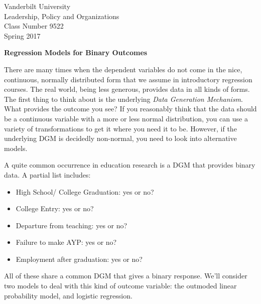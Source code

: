 \documentclass[12pt]{article}
\begin{document}
\thispagestyle{empty}%

\setlength{\parskip}{1ex plus 0.5ex minus 0.2ex}

\setcounter{secnumdepth}{-2}


\begin{flushleft}
Vanderbilt University\\Leadership, Policy and Organizations\\Class Number 9522\\ Spring 2017\\
\end{flushleft}

\begin{center}
\textbf{Regression Models for Binary Outcomes}
\end{center}


There are many times when the dependent variables  do not come in the
nice, continuous, normally distributed form that we assume in
introductory regression courses. The real world, being less generous,
provides data in all kinds of forms. The first thing to think about is
the underlying \textit{Data Generation Mechanism}. What provides the
outcome you see? If you reasonably think that the data should be a
continuous variable with a more or less normal distribution, you can
use a variety of transformations to get it where you need it to
be. However, if the underlying DGM is decidedly non-normal, you need
to look into alternative models.

A quite common occurrence in education research is a DGM that provides
binary data. A partial list includes:

\begin{itemize}
\item High School/ College Graduation: yes or no?

\item College Entry: yes or no?

\item Departure from teaching: yes or no?

\item Failure to make AYP: yes or no?

\item Employment after graduation: yes or no?


\end{itemize}

All of these share a common DGM that gives a binary response. We'll
consider two models to deal with this kind of outcome variable: the
outmoded linear probability model, and logistic regression. 
\end{document}
